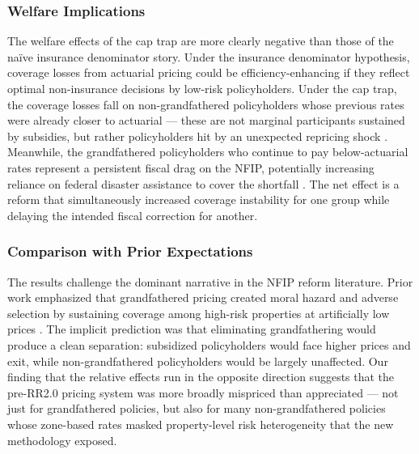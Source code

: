 \documentclass[12pt]{article}
\begin{document}
\subsubsection*{Welfare Implications} The welfare effects of the cap trap are more clearly negative than those of the na\"ive insurance denominator story. Under the insurance denominator hypothesis, coverage losses from actuarial pricing could be efficiency-enhancing if they reflect optimal non-insurance decisions by low-risk policyholders. Under the cap trap, the coverage losses fall on non-grandfathered policyholders whose previous rates were already closer to actuarial --- these are not marginal participants sustained by subsidies, but rather policyholders hit by an unexpected repricing shock \citep{jaffee2006}. Meanwhile, the grandfathered policyholders who continue to pay below-actuarial rates represent a persistent fiscal drag on the NFIP, potentially increasing reliance on federal disaster assistance to cover the shortfall \citep{deryugina2017, deryugina2014}. The net effect is a reform that simultaneously increased coverage instability for one group while delaying the intended fiscal correction for another.

\subsubsection*{Comparison with Prior Expectations} The results challenge the dominant narrative in the NFIP reform literature. Prior work emphasized that grandfathered pricing created moral hazard and adverse selection by sustaining coverage among high-risk properties at artificially low prices \citep{browne2000, bradt2021}. The implicit prediction was that eliminating grandfathering would produce a clean separation: subsidized policyholders would face higher prices and exit, while non-grandfathered policyholders would be largely unaffected. Our finding that the relative effects run in the opposite direction suggests that the pre-RR2.0 pricing system was more broadly mispriced than appreciated --- not just for grandfathered policies, but also for many non-grandfathered policies whose zone-based rates masked property-level risk heterogeneity that the new methodology exposed.
\end{document}
